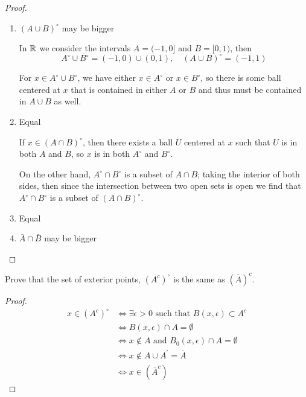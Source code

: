 \begin{proof} \
\begin{enumerate}
\item $(A\cup B)^\circ$ may be bigger

In $\mathbb R$ we consider the intervals $A=(-1,0]$ and $B=[0,1)$, then
\[ A^\circ\cup B^\circ=(-1,0)\cup(0,1), \quad (A\cup B)^\circ=(-1,1) \]

For $x \in A^\circ \cup B^\circ$, we have either $x \in A^\circ$ or $x \in B^\circ$, so there is some ball centered at $x$ that is contained in either $A$ or $B$ and thus must be contained in $A\cup B$ as well.

\item Equal

If $x \in (A\cap B)^\circ$, then there exists a ball $U$ centered at $x$ such that $U$ is in both $A$ and $B$, so $x$ is in both $A^\circ$ and $B^\circ$.

On the other hand, $A^\circ\cap B^\circ$ is a subset of $A\cap B$; taking the interior of both sides, then since the intersection between two open sets is open we find that $A^\circ\cap B^\circ$ is a subset of $(A\cap B)^\circ$.

\item Equal

\item $\bar{A}\cap\bar{B}$ may be bigger
\end{enumerate}
\end{proof}

\begin{prbm}
Prove that the set of exterior points, $(A^c)^\circ$ is the same as $(\bar{A})^c$.
\end{prbm}

\begin{proof}
\begin{align*}
x \in (A^c)^\circ 
&\iff \exists \epsilon>0 \text{ such that } B(x,\epsilon) \subset A^c \\
&\iff B(x,\epsilon) \cap A = \emptyset \\
&\iff x \notin A \text{ and } B_0(x,\epsilon) \cap A=\emptyset \\
&\iff x \notin A \cup A^\prime = \bar A \\
&\iff x \in (\bar A^c)
\end{align*}
\end{proof}


